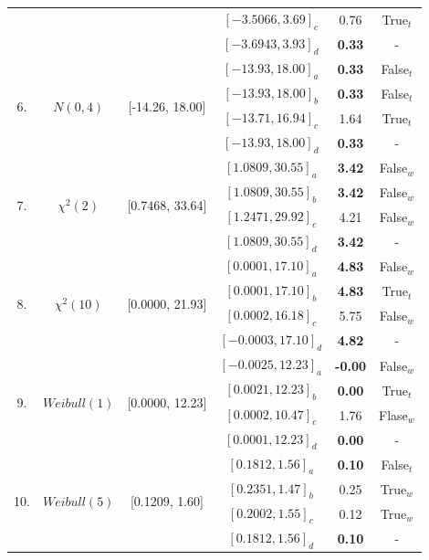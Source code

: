 \documentclass[a4paper,fleqn]{cas-dc}
\begin{document}
\begin{table}[h!]
\begin{threeparttable}
\begin{tabular}{|c|c|c|c|c|c|}
    &&&$[-3.5066, 3.69]_c$ & 0.76      & True$_t$\\
    &&&$[-3.6943, 3.93]_d$ & \bf{0.33} & - \\    
\hline
\multirow{4}{*}{6.} & \multirow{4}{*}{$N(0 ,4)$}&\multirow{4}{*}{[-14.26, 18.00]} & $[-13.93, 18.00]_a$& 
    \bf{0.33} & False$_t$\\
    &&&$[-13.93, 18.00]_b$ & \bf{0.33} & False$_t$\\
    &&&$[-13.71, 16.94]_c$ & 1.64      & True$_t$\\
    &&&$[-13.93, 18.00]_d$ & \bf{0.33} & - \\
\hline
\multirow{4}{*}{7.} & \multirow{4}{*}{$\chi^2(2)$}&\multirow{4}{*}{[0.7468, 33.64]} & $[1.0809, 30.55]_a$& 
    \bf{3.42} & False$_w$\\
    &&&$[1.0809, 30.55]_b$ & \bf{3.42} & False$_w$\\
    &&&$[1.2471, 29.92]_c$ & 4.21      & False$_w$\\
    &&&$[1.0809, 30.55]_d$ & \bf{3.42} & - \\                
\hline
\multirow{4}{*}{8.} & \multirow{4}{*}{$\chi^2(10)$}&\multirow{4}{*}{[0.0000, 21.93]} & $[0.0001, 17.10]_a$& 
    \bf{4.83} & False$_w$\\
    &&&$[0.0001, 17.10]_b$ & \bf{4.83} & True$_t$\\
    &&&$[0.0002, 16.18]_c$ & 5.75      & False$_w$\\
    &&&$[-0.0003, 17.10]_d$ & \bf{4.82} & - \\
\hline
\multirow{4}{*}{9.} & \multirow{4}{*}{$Weibull(1)$}&\multirow{4}{*}{[0.0000, 12.23]} & 
$[-0.0025, 12.23]_a$& 
    \bf{-0.00} & False$_w$\\
    &&&$[0.0021, 12.23]_b$ & \bf{0.00} & True$_t$\\
    &&&$[0.0002, 10.47]_c$ & 1.76      & Flase$_w$\\
    &&&$[0.0001, 12.23]_d$ & \bf{0.00} & - \\
\hline
\multirow{4}{*}{10.} & \multirow{4}{*}{$Weibull(5)$}&\multirow{4}{*}{[0.1209, 1.60]} & $[0.1812, 1.56]_a$& 
    \bf{0.10} & False$_t$\\
    &&&$[0.2351, 1.47]_b$ & 0.25 & True$_w$\\
    &&&$[0.2002, 1.55]_c$ & 0.12      & True$_w$\\
    &&&$[0.1812, 1.56]_d$ & \bf{0.10} & - \\    
  

\end{tabular}
\end{threeparttable}
\end{table}
\end{document}
